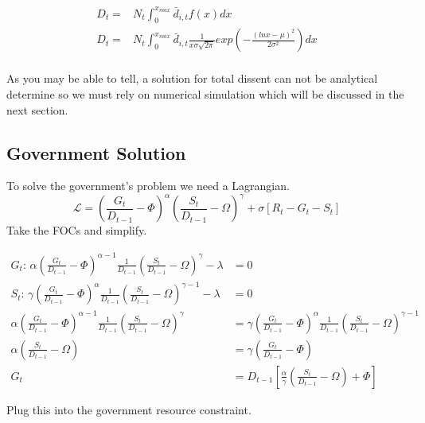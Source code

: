 \documentclass[12pt]{article}
\begin{document}
\begin{spacing}{1.5}
\begin{equation}
	\begin{aligned}
D_t=& N_t \int_{0}^{x_{max}} \bar{d}_{i,t} f(x) dx \\	
D_t	=& N_t \int_{0}^{x_{max}} \bar{d}_{i,t} \frac{1}{x\sigma \sqrt{2\pi}}exp  \left( -\frac{(lnx-\mu)^2}{2\sigma^2} \right)  dx \\	
	\end{aligned}
\end{equation}

As you may be able to tell, a solution for total dissent can not be analytical determine so we must rely on numerical simulation which will be discussed in the next section. 


\subsection{Government Solution}

To solve the government's problem we need a Lagrangian.
\begin{equation}
\mathcal{L} = \left(\frac{G_t}{ D_{t-1}}-\Phi\right)^\alpha \left(\frac{S_t}{ D_{t-1}}-\Omega\right)^\gamma  +\sigma[R_t-G_t-S_t] 
\end{equation}
Take the FOCs and simplify.

\begin{equation}
    \begin{aligned}
        G_t\text{: } \alpha \left(\frac{G_t}{ D_{t-1}}-\Phi\right)^{\alpha-1} \frac{1}{ D_{t-1}} \left(\frac{S_t}{D_{t-1}}-\Omega\right)^\gamma  -\lambda &=0  \\
S_t\text{: } \gamma  \left(\frac{G_t}{ D_{t-1}}-\Phi\right)^{\alpha} \frac{1}{D_{t-1}} \left(\frac{S_t}{D_{t-1}}-\Omega\right)^{\gamma -1} -\lambda &=0 \\
\alpha \left(\frac{G_t}{D_{t-1}}-\Phi\right)^{\alpha-1} \frac{1}{ D_{t-1}} \left(\frac{S_t}{D_{t-1}}-\Omega\right)^\gamma  &= \gamma  \left(\frac{G_t}{ D_{t-1}}-\Phi\right)^{\alpha} \frac{1}{ D_{t-1}} \left(\frac{S_t}{ D_{t-1}}-\Omega\right)^{\gamma -1} \\
\alpha \left(\frac{S_t}{ D_{t-1}}-\Omega \right) &= \gamma  \left( \frac{G_t}{ D_{t-1}}-\Phi \right) \\
G_t&= D_{t-1}\left[\frac{\alpha}{\gamma } \left(\frac{S_t}{ D_{t-1}} -\Omega \right)+\Phi \right]
    \end{aligned}
\end{equation}


\noindent Plug this into the government resource constraint. 



\end{spacing}
\end{document}
